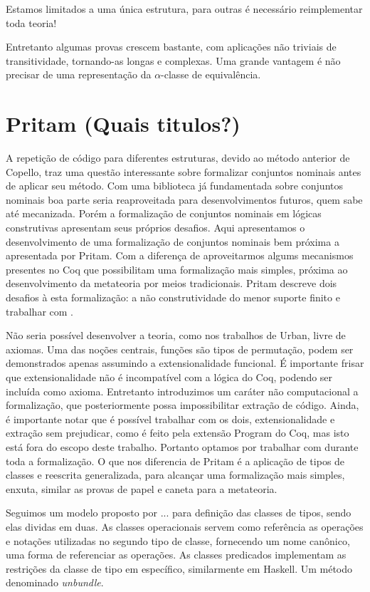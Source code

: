 Estamos limitados a uma única estrutura, para outras é necessário reimplementar toda teoria!

Entretanto algumas provas crescem bastante, com aplicações não triviais de transitividade, tornando-as longas e complexas. Uma grande vantagem é não precisar de uma representação da $\alpha$-classe de equivalência.


\section{Pritam (Quais titulos?)}\label{sec:choudhury}
A repetição de código para diferentes estruturas, devido ao método anterior de Copello, traz uma questão interessante sobre formalizar conjuntos nominais antes de aplicar seu método. Com uma biblioteca já fundamentada sobre conjuntos nominais boa parte seria reaproveitada para desenvolvimentos futuros, quem sabe até mecanizada. Porém a formalização de conjuntos nominais em lógicas construtivas apresentam seus próprios desafios. Aqui apresentamos o desenvolvimento de uma formalização de conjuntos nominais bem próxima a apresentada por Pritam. Com a diferença de aproveitarmos algums mecanismos presentes no Coq que possibilitam uma formalização mais simples, próxima ao desenvolvimento da metateoria por meios tradicionais. Pritam descreve dois desafios à esta formalização: a não construtividade do menor suporte finito e trabalhar com \setoids.

Não seria possível desenvolver a teoria, como nos trabalhos de Urban, livre de axiomas. Uma das noções centrais, funções são tipos de permutação, podem ser demonstrados apenas assumindo a extensionalidade funcional. É importante frisar que extensionalidade não é incompatível com a lógica do Coq, podendo ser incluída como axioma. Entretanto introduzimos um caráter não computacional a formalização, que posteriormente possa impossibilitar extração de código. Ainda, é importante notar que é possível trabalhar com os dois, extensionalidade e extração sem prejudicar, como é feito pela extensão Program do Coq, mas isto está fora do escopo deste trabalho. Portanto optamos por trabalhar com \setoids durante toda a formalização. O que nos diferencia de Pritam é a aplicação de tipos de classes e reescrita generalizada, para alcançar uma formalização mais simples, enxuta, similar as provas de papel e caneta para a metateoria.

Seguimos um modelo proposto por ... para definição das classes de tipos, sendo elas dividas em duas. As classes operacionais servem como referência as operações e notações utilizadas no segundo tipo de classe, fornecendo um nome canônico, uma forma de referenciar as operações. As classes predicados implementam as restrições da classe de tipo em específico, similarmente em Haskell. Um método denominado \textit{unbundle}.


